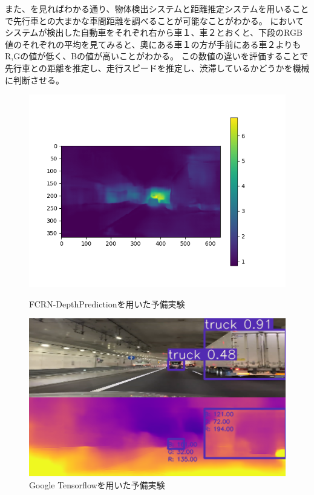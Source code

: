 また、を見ればわかる通り、物体検出システムと距離推定システムを用いることで先行車との大まかな車間距離を調べることが可能なことがわかる。
においてシステムが検出した自動車をそれぞれ右から車１、車２とおくと、下段のRGB値のそれぞれの平均を見てみると、奥にある車１の方が手前にある車２よりもR,Gの値が低く、Bの値が高いことがわかる。
この数値の違いを評価することで先行車との距離を推定し、走行スピードを推定し、渋滞しているかどうかを機械に判断させる。


\begin{figure}[htbp]
  \begin{center}
   \includegraphics[width=12cm]{figs/preex1.png}
  \end{center}
  \caption{FCRN-DepthPredictionを用いた予備実験}
  \label{fig:preex1}

 \begin{center}
  \includegraphics[width=12cm]{figs/preex2.png}
 \end{center}
  \caption{Google Tensorflowを用いた予備実験}
  \label{fig:preex2}
\end{figure}

